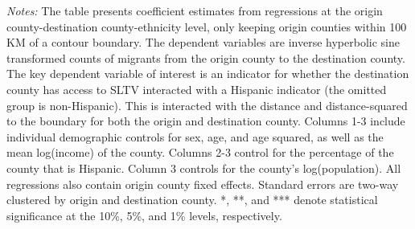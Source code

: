 \begin{table}[!h]
{\begin{threeparttable}
\begin{tablenotes}[flushleft]
				\item \textit{Notes:} The table presents coefficient estimates from regressions at the origin county-destination county-ethnicity level, only keeping origin counties within 100 KM of a contour boundary. The dependent variables are inverse hyperbolic sine transformed counts of migrants from the origin county to the destination county. The key dependent variable of interest is an indicator for whether the destination county has access to SLTV interacted with a Hispanic indicator (the omitted group is non-Hispanic). This is interacted with the distance and distance-squared to the boundary for both the origin and destination county. Columns 1-3 include individual demographic controls for sex, age, and age squared, as well as the mean log(income) of the county. Columns 2-3 control for the percentage of the county that is Hispanic. Column 3 controls for the county's log(population). All regressions also contain origin county fixed effects. Standard errors are two-way clustered by origin and destination county. *, **, and *** denote statistical significance at the 10\%, 5\%, and 1\% levels, respectively.
			\end{tablenotes}
		\end{threeparttable}
	}
\end{table}
